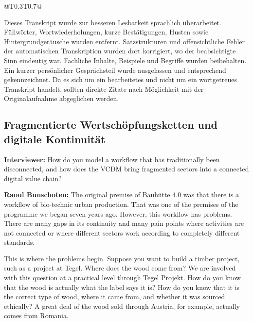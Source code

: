 \label{anlage:transkript-bunschoten}

\begin{Table}[title=Interviewinformationen]
\begin{SemioTable}{@{}T{0.3\tabcolsep}T{0.7\tabcolsep}@{}}
\end{SemioTable}
\end{Table}

Dieses Transkript wurde zur besseren Lesbarkeit sprachlich überarbeitet. Füllwörter, Wortwiederholungen, kurze Bestätigungen, Husten sowie Hintergrundgeräusche wurden entfernt. Satzstrukturen und offensichtliche Fehler der automatischen Transkription wurden dort korrigiert, wo der beabsichtigte Sinn eindeutig war. Fachliche Inhalte, Beispiele und Begriffe wurden beibehalten. Ein kurzer persönlicher Gesprächsteil wurde ausgelassen und entsprechend gekennzeichnet. Da es sich um ein bearbeitetes und nicht um ein wortgetreues Transkript handelt, sollten direkte Zitate nach Möglichkeit mit der Originalaufnahme abgeglichen werden.

\subsection{Fragmentierte Wertschöpfungsketten und digitale Kontinuität}

\textbf{Interviewer:} How do you model a workflow that has traditionally been disconnected, and how does the VCDM bring fragmented sectors into a connected digital value chain?

\textbf{Raoul Bunschoten:} The original premise of Bauhütte 4.0 was that there is a workflow of bio-technic urban production. That was one of the premises of the programme we began seven years ago. However, this workflow has problems. There are many gaps in its continuity and many pain points where activities are not connected or where different sectors work according to completely different standards.

This is where the problems begin. Suppose you want to build a timber project, such as a project at Tegel. Where does the wood come from? We are involved with this question at a practical level through Tegel Projekt. How do you know that the wood is actually what the label says it is? How do you know that it is the correct type of wood, where it came from, and whether it was sourced ethically? A great deal of the wood sold through Austria, for example, actually comes from Romania.

